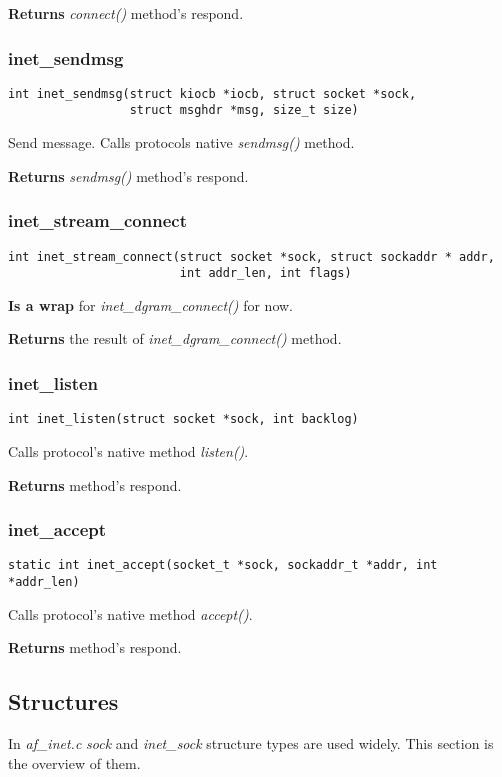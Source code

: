 \documentclass[12pt,a4paper]{article}
\begin{document}
{\bf Returns} {\it connect()} method's respond.

\subsubsection{inet\_sendmsg}
\label{sec:embox_net_inet_sendmsg}
\begin{verbatim}
int inet_sendmsg(struct kiocb *iocb, struct socket *sock,
                 struct msghdr *msg, size_t size)
\end{verbatim}
Send message. Calls protocols native {\it sendmsg()} method.

{\bf Returns} {\it sendmsg()} method's respond.


\subsubsection{inet\_stream\_connect}
\label{sec:af_inet_inet_stream_connect}
\begin{verbatim}
int inet_stream_connect(struct socket *sock, struct sockaddr * addr,
                        int addr_len, int flags)
\end{verbatim}
{\bf Is a wrap} for {\it inet\_dgram\_connect()} for now.

{\bf Returns} the result of {\it inet\_dgram\_connect()} method.

\subsubsection{inet\_listen}
\label{sec:af_inet_inet_listen}
\begin{verbatim}
int inet_listen(struct socket *sock, int backlog)
\end{verbatim}
Calls protocol's native method {\it listen()}.

{\bf Returns} method's respond.

\subsubsection{inet\_accept}
\label{sec:af_inet_inet_accept}
\begin{verbatim}
static int inet_accept(socket_t *sock, sockaddr_t *addr, int *addr_len)
\end{verbatim}
Calls protocol's native method {\it accept()}.

{\bf Returns} method's respond.

\subsection{Structures}
\label{sec:af_inet_structures}
In {\it af\_inet.c} {\it sock} and {\it inet\_sock} structure types are used
widely. This section is the overview of them.
\end{document}
